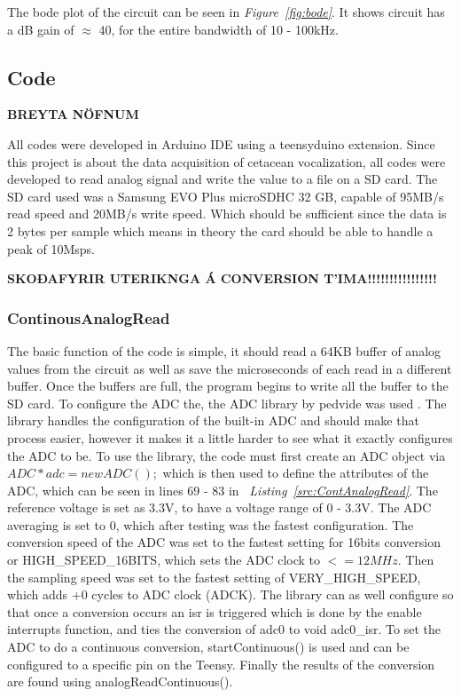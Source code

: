 The bode plot of the circuit can be seen in \textit{Figure~\ref{fig:bode}}.
It shows  circuit has a dB gain of $\approx$ 40, for the entire bandwidth of 10 - 100kHz.



\clearpage
\subsection{Code}


\textbf{BREYTA NÖFNUM}


All codes were developed in Arduino IDE using a teensyduino extension.
Since this project is about the data acquisition of cetacean vocalization, all codes were developed to read analog signal and write the value to a file on a SD card.
The SD card used was a Samsung EVO Plus microSDHC 32 GB, capable of 95MB/s read speed and 20MB/s write speed.
Which should be sufficient since the data is 2 bytes per sample which means in theory the card should be able to handle a peak of 10Msps.



\textbf{SKOÐAFYRIR UTERIKNGA Á CONVERSION T'IMA!!!!!!!!!!!!!!!!}

\subsubsection{ContinousAnalogRead}

The basic function of the code is simple, it should read a 64KB buffer of  analog values from the circuit as well as save the microseconds of each read in a different buffer.
Once the buffers are full, the program begins to write all the buffer to the SD card.
To configure the ADC the, the ADC library by pedvide was used \cite{villanueva_pedvideadc_2021}.
The library handles the configuration of the built-in ADC and should make that process easier, however it makes it a little harder to see what it exactly configures the ADC to be.
To use the library, the code must first create an ADC object via 
$ADC *adc = new ADC();$
which is then used to define the attributes of the ADC, which can be seen in lines 69 - 83 in~ \textit{Listing~\ref{src:ContAnalogRead}}. 
The reference voltage is set as 3.3V, to have a voltage range of 0 - 3.3V.
The ADC averaging is set to 0, which after testing was the fastest configuration.
The conversion speed of the ADC was set to the fastest setting for 16bits conversion or HIGH\_SPEED\_16BITS, which sets the ADC clock to $<= 12 MHz$.
Then the sampling speed was set to the fastest setting of VERY\_HIGH\_SPEED, which adds +0 cycles to ADC clock (ADCK).
The library can as well configure so that once a conversion occurs an isr is triggered which is done by the enable interrupts function, and ties the conversion of adc0 to void adc0\_isr.
To set the ADC to do a continuous conversion, startContinuous() is used and can be configured to a specific pin on the Teensy.
Finally the results of the conversion are found using analogReadContinuous().

